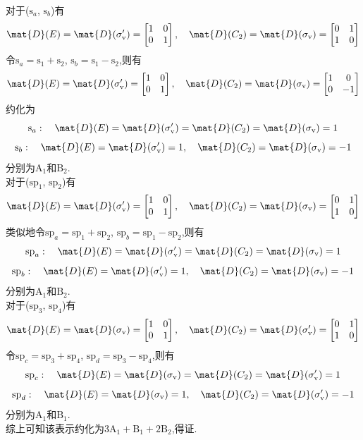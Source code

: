 \documentclass{ctexart}
\begin{document}
\begin{solution}
\begin{enumerate}[label=\tbf{(\alph*)}]
    对于($\text{s}_a$, $\text{s}_b$)有
    \[\mat{D}(E)=\mat{D}(\sigma_{\text{v}}')=\begin{bmatrix}
        1&0\\
        0&1
    \end{bmatrix},\quad\mat{D}(C_2)=\mat{D}(\sigma_{\text{v}})=\begin{bmatrix}
        0&1\\
        1&0
    \end{bmatrix}\]
    令$\text{s}_a=\text{s}_1+\text{s}_2$, $\text{s}_b=\text{s}_1-\text{s}_2$,则有
    \[\mat{D}(E)=\mat{D}(\sigma_{\text{v}}')=\begin{bmatrix}
        1&0\\
        0&1
    \end{bmatrix},\quad\mat{D}(C_2)=\mat{D}(\sigma_{\text{v}})=\begin{bmatrix}
        1&0\\
        0&-1
    \end{bmatrix}\]
    约化为
    \[\text{s}_a:\quad\mat{D}(E)=\mat{D}(\sigma_{\text{v}}')=\mat{D}(C_2)=\mat{D}(\sigma_{\text{v}})=1\]
    \[\text{s}_b:\quad\mat{D}(E)=\mat{D}(\sigma_{\text{v}}')=1,\quad\mat{D}(C_2)=\mat{D}(\sigma_{\text{v}})=-1\]
    分别为$\text{A}_1$和$\text{B}_2$.\\
    对于($\text{sp}_1$, $\text{sp}_2$)有
    \[\mat{D}(E)=\mat{D}(\sigma_{\text{v}}')=\begin{bmatrix}
        1&0\\
        0&1
    \end{bmatrix},\quad\mat{D}(C_2)=\mat{D}(\sigma_{\text{v}})=\begin{bmatrix}
        0&1\\
        1&0
    \end{bmatrix}\]
    类似地令$\text{sp}_a=\text{sp}_1+\text{sp}_2$, $\text{sp}_b=\text{sp}_1-\text{sp}_2$,则有
    \[\text{sp}_a:\quad\mat{D}(E)=\mat{D}(\sigma_{\text{v}}')=\mat{D}(C_2)=\mat{D}(\sigma_{\text{v}})=1\]
    \[\text{sp}_b:\quad\mat{D}(E)=\mat{D}(\sigma_{\text{v}}')=1,\quad\mat{D}(C_2)=\mat{D}(\sigma_{\text{v}})=-1\]
    分别为$\text{A}_1$和$\text{B}_2$.\\
    对于($\text{sp}_3$, $\text{sp}_4$)有
    \[\mat{D}(E)=\mat{D}(\sigma_\text{v})=\begin{bmatrix}
        1&0\\
        0&1
    \end{bmatrix},\quad\mat{D}(C_2)=\mat{D}(\sigma_\text{v}')=\begin{bmatrix}
        0&1\\
        1&0
    \end{bmatrix}\]
    令$\text{sp}_c=\text{sp}_3+\text{sp}_4$, $\text{sp}_d=\text{sp}_3-\text{sp}_4$,则有
    \[\text{sp}_c:\quad\mat{D}(E)=\mat{D}(\sigma_\text{v})=\mat{D}(C_2)=\mat{D}(\sigma_\text{v}')=1\]
    \[\text{sp}_d:\quad\mat{D}(E)=\mat{D}(\sigma_\text{v})=1,\quad\mat{D}(C_2)=\mat{D}(\sigma_\text{v}')=-1\]
    分别为$\text{A}_1$和$\text{B}_1$.\\
    综上可知该表示约化为$3\text{A}_1+\text{B}_1+2\text{B}_2$,得证.
\end{enumerate}
\end{solution}
\end{document}

